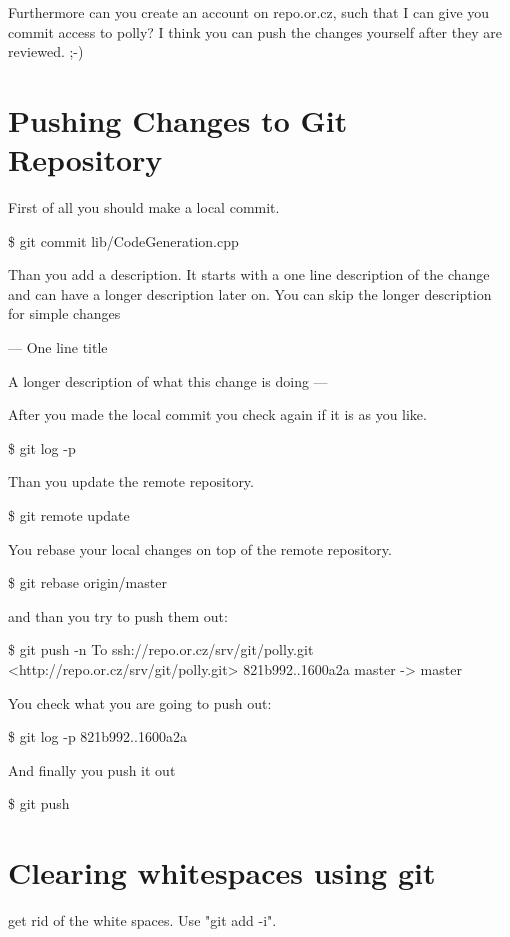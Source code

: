 \documentclass[a4paper,10pt]{article}
\begin{document}
   Furthermore can you create an account on repo.or.cz, such that I can give you commit access to polly? I think you can push the changes yourself after they are reviewed. ;-)

\section{Pushing Changes to Git Repository}
   First of all you should make a local commit.

   \$ git commit lib/CodeGeneration.cpp

   Than you add a description. It starts with a one line description of the change and can have a longer description later on. You can skip the longer description for simple changes

   ---
   One line title

   A longer description of what this change is doing
   ---

   After you made the local commit you check again if it is as you like.

   \$ git log -p

   Than you update the remote repository.

   \$ git remote update

   You rebase your local changes on top of the remote repository.

   \$ git rebase origin/master

   and than you try to push them out:


   \$ git push -n
   To ssh://repo.or.cz/srv/git/polly.git
   <http://repo.or.cz/srv/git/polly.git>
   821b992..1600a2a  master -> master

   You check what you are going to push out:

   \$ git log -p 821b992..1600a2a

   And finally you push it out

   \$ git push



\section{Clearing whitespaces using git}

get rid of the white spaces. Use "git add -i".
\end{document}
